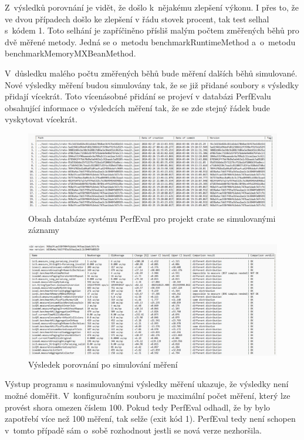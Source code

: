 Z~výsledků porovnání je vidět, že došlo k~nějakému zlepšení výkonu. I přes to, že
ve dvou případech došlo ke zlepšení v řádu stovek procent, tak test selhal s~kódem 1.
Toto selhání je zapříčiněno přísliš malým počtem změřených běhů pro dvě měřené metody.
Jedná se o~metodu benchmarkRuntimeMethod a~o~metodu benchmarkMemoryMXBeanMethod.

V~důsledku malého počtu změřených běhů bude měření dalších běhů simulované. Nové
výsledky měření budou simulovány tak, že se již přidané soubory s výsledky přidají vícekrát.
Toto vícenásobné přidání se projeví v databázi PerfEvalu obsahující informace o~výsledcích měření tak,
že se zde stejný řádek bude vyskytovat vícekrát.

\begin{figure}[h!]
    \centering
    \includegraphics[width=1\textwidth]{../img/list-results-crate2.png}
    \caption{Obsah databáze systému PerfEval pro projekt crate se simulovanými záznamy}
\end{figure}

\begin{figure}[h!]
    \centering
    \includegraphics[width=1\textwidth]{../img/version-comparison-es.png}
    \caption{Výsledek porovnání po simulování měření}
\end{figure}

Výstup programu s nasimulovanými výsledky měření ukazuje, že výsledky není možné
doměřit. V~konfiguračním souboru je maximální počet měření, který lze provést shora omezen číslem 100.
Pokud tedy PerfEval odhadl, že by bylo zapotřebí více než 100 měření, tak selže (exit kód 1).
PerfEval tedy není schopen v~tomto případě sám o~sobě rozhodnout jestli se nová verze nezhoršila.
